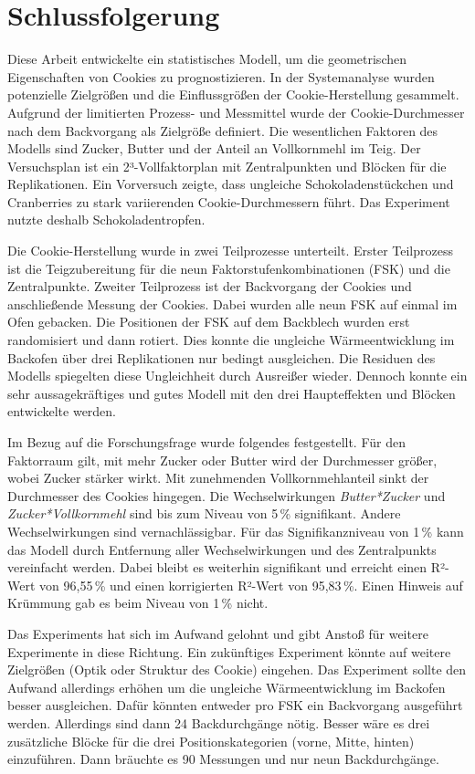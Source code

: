 \chapter{Schlussfolgerung}\label{ch:schlussfolgerung}

Diese Arbeit entwickelte ein statistisches Modell, um die geometrischen Eigenschaften von Cookies zu prognostizieren.
In der Systemanalyse wurden potenzielle Zielgrößen und die Einflussgrößen der Cookie-Herstellung gesammelt.
Aufgrund der limitierten Prozess- und Messmittel wurde der Cookie-Durchmesser nach dem Backvorgang als Zielgröße definiert.
Die wesentlichen Faktoren des Modells sind Zucker, Butter und der Anteil an Vollkornmehl im Teig.
Der Versuchsplan ist ein 2³-Vollfaktorplan mit Zentralpunkten und Blöcken für die Replikationen.
Ein Vorversuch zeigte, dass ungleiche Schokoladenstückchen und Cranberries zu stark variierenden Cookie-Durchmessern führt.
Das Experiment nutzte deshalb Schokoladentropfen.

Die Cookie-Herstellung wurde in zwei Teilprozesse unterteilt.
Erster Teilprozess ist die Teigzubereitung für die neun Faktorstufenkombinationen (FSK) und die Zentralpunkte.
Zweiter Teilprozess ist der Backvorgang der Cookies und anschließende Messung der Cookies.
Dabei wurden alle neun FSK auf einmal im Ofen gebacken.
Die Positionen der FSK auf dem Backblech wurden erst randomisiert und dann rotiert.
Dies konnte die ungleiche Wärmeentwicklung im Backofen über drei Replikationen nur bedingt ausgleichen.
Die Residuen des Modells spiegelten diese Ungleichheit durch Ausreißer wieder.
Dennoch konnte ein sehr aussagekräftiges und gutes Modell mit den drei Haupteffekten und Blöcken entwickelte werden.

Im Bezug auf die Forschungsfrage wurde folgendes festgestellt.
Für den Faktorraum gilt, mit mehr Zucker oder Butter wird der Durchmesser größer, wobei Zucker stärker wirkt.
Mit zunehmenden Vollkornmehlanteil sinkt der Durchmesser des Cookies hingegen.
Die Wechselwirkungen \emph{Butter*Zucker} und \emph{Zucker*Vollkornmehl} sind bis zum Niveau von 5\,\% signifikant.
Andere Wechselwirkungen sind vernachlässigbar.
Für das Signifikanzniveau von 1\,\% kann das Modell durch Entfernung aller Wechselwirkungen und des Zentralpunkts vereinfacht werden.
Dabei bleibt es weiterhin signifikant und erreicht einen R²-Wert von 96,55\,\% und einen korrigierten R²-Wert von 95,83\,\%.
Einen Hinweis auf Krümmung gab es beim Niveau von 1\,\% nicht.

Das Experiments hat sich im Aufwand gelohnt und gibt Anstoß für weitere Experimente in diese Richtung.
Ein zukünftiges Experiment könnte auf weitere Zielgrößen (\zB Optik oder Struktur des Cookie) eingehen.
Das Experiment sollte den Aufwand allerdings erhöhen um die ungleiche Wärmeentwicklung im Backofen besser ausgleichen.
Dafür könnten entweder pro FSK ein Backvorgang ausgeführt werden.
Allerdings sind dann 24 Backdurchgänge nötig.
Besser wäre es drei zusätzliche Blöcke für die drei Positionskategorien (vorne, Mitte, hinten) einzuführen.
Dann bräuchte es 90 Messungen und nur neun Backdurchgänge.
